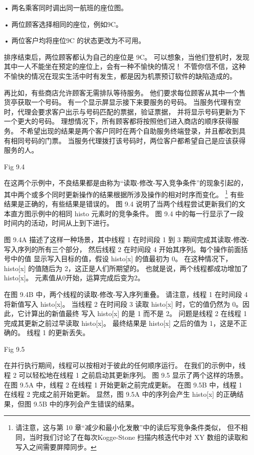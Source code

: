 • 两名乘客同时调出同一航班的座位图。

• 两位顾客选择相同的座位，例如9C。

• 两位客户均将座位9C 的状态更改为不可用。

排序结束后，两位顾客都认为自己的座位是 9C。 
可以想象，当他们登机时，发现其中一人不能坐在预定的座位上，会有一种不愉快的情况！ 
不管你信不信，这种不愉快的情况在现实生活中时有发生，都是因为机票预订软件的缺陷造成的。

再比如，有些商店允许顾客无需排队等待服务。 他们要求每位顾客从其中一个售货亭获取一个号码。 
有一个显示屏显示接下来要服务的号码。 当服务代理有空时，代理会要求客户出示与号码匹配的票据，验证票据，
并将显示号码更新为下一个更大的号码。 理想情况下，所有顾客都将按照他们进入商店的顺序获得服务。 
不希望出现的结果是两个客户同时在两个自助服务终端登录，并且都收到具有相同号码的门票。 
当服务代理拨打该号码时，两位客户都希望自己是应该获得服务的人。

{\color{red} Fig 9.4}

在这两个示例中，不良结果都是由称为“读取-修改-写入竞争条件”的现象引起的，
其中两个或多个同时更新操作的结果根据所涉及操作的相对时序而变化。 
\footnote{请注意，这与第 10 章“减少和最小化发散”中的读后写竞争条件类似，
但不相同，当时我们讨论了在每次Kogge-Stone 扫描内核迭代中对 XY 数组的读取和写入之间需要屏障同步。}
有些结果是正确的，有些结果是错误的。
图 9.4 说明了当两个线程尝试更新我们的文本直方图示例中的相同 histo 元素时的竞争条件。 
图 9.4 中的每一行显示了一段时间内的活动，时间从上到下进行。

图 9.4A 描述了这样一种场景，其中线程 1 在时间段 1 到 3 期间完成其读取-修改-写入序列的所有三个部分，
然后线程 2 在时间段 4 开始其序列。每个操作前面括号中的值 显示写入目标的值，假设 histo[x] 的值最初为 0。
在这种情况下，histo[x] 的值随后为 2，这正是人们所期望的。 也就是说，两个线程都成功增加了 histo[x]。 
元素值从0开始，运算完成后变为2。

在图 9.4B 中，两个线程的读取-修改-写入序列重叠。 请注意，线程 1 在时间段 4 将新值写入 histo[x]。
当线程 2 在时间段 3 读取 histo[x] 时，它的值仍然为 0。因此，它计算出的新值最终 写入 histo[x] 的是 1 而不是 2。
问题是线程 2 在线程 1 完成其更新之前过早读取 histo[x]。 最终结果是 histo[x] 之后的值为 1，这是不正确的。 
线程 1 的更新丢失。

{\color{red} Fig 9.5}

在并行执行期间，线程可以按相对于彼此的任何顺序运行。 在我们的示例中，线程 2 可以轻松地在线程 1 之前启动其更新序列。
图 9.5 显示了两个这样的场景。 在图 9.5A 中，线程 2 在线程 1 开始更新之前完成更新。 
在图 9.5B 中，线程 1 在线程 2 完成之前开始更新。 
显然，图 9.5A 中的序列会产生 histo[x] 的正确结果，但图 9.5B 中的序列会产生错误的结果。


